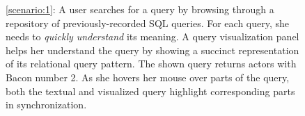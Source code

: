 \documentclass[letterpaper,11pt]{article}
\begin{document}






\begin{figure}[t]
%
   \centering
{}
\hspace{4mm}
%
	\caption{\autoref{scenario:1}: A user searches for a query by browsing through a repository 
	of previously-recorded SQL queries.
	For each query, she needs to \emph{quickly understand} its meaning. 
	A query visualization panel helps her understand the query by showing a 
	succinct representation of its relational query pattern. 
	The shown query returns actors with Bacon number 2.
	As she hovers her mouse over parts of the query, 
	both the textual and visualized query highlight corresponding parts in synchronization.
}
\label{Fig_KevinBacon}
\end{figure}
\end{document}

